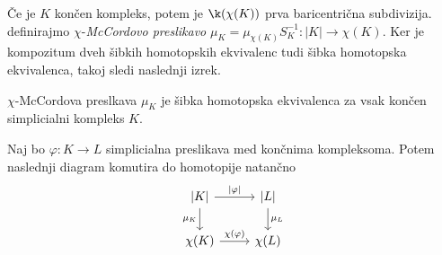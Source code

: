 Če je $K$ končen kompleks, potem je $\k(\chi(K))$ prva baricentrična subdivizija.
definirajmo $\chi$-\textit{McCordovo preslikavo} $\mu_K=\mu_{\chi(K)}S_K^{-1}: |K|\rightarrow \chi(K)$. 
Ker je kompozitum dveh šibkih homotopskih ekvivalenc tudi šibka homotopska ekvivalenca, takoj sledi naslednji izrek.

\begin{izrek}
    $\chi$-McCordova preslkava $\mu_K$ je šibka homotopska
     ekvivalenca za vsak končen simplicialni kompleks $K$.
\end{izrek}


\begin{trditev}
    Naj bo $\varphi: K\rightarrow L$ simplicialna preslikava med končnima kompleksoma. Potem naslednji diagram komutira do homotopije natančno
    \\
  
\[\begin{tikzcd}
    {|K|} \arrow{r}{|\varphi|} \arrow[swap]{d}{\mu_K} & {|L|} \arrow{d}{\mu_L} \\
    \chi(K) \arrow{r}{\chi(\varphi)} & \chi(L)
    \end{tikzcd}
    \]
\end{trditev}

